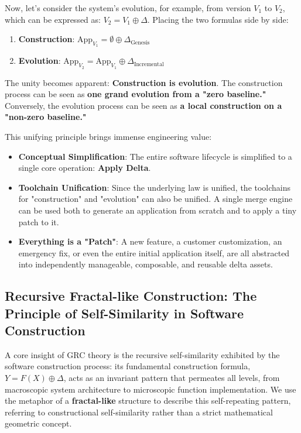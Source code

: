 \documentclass[11pt]{article}
\begin{document}
Now, let's consider the system's evolution, for example, from version $V_1$ to $V_2$, which can be expressed as: $V_2 = V_1 \oplus \Delta$. Placing the two formulas side by side:

\begin{enumerate}
    \item \textbf{Construction}: $\text{App}_{V_1} = \emptyset \oplus \Delta_{\text{Genesis}}$
    \item \textbf{Evolution}: $\text{App}_{V_2} = \text{App}_{V_1} \oplus \Delta_{\text{Incremental}}$
\end{enumerate}

The unity becomes apparent: \textbf{Construction is evolution}. The construction process can be seen as \textbf{one grand evolution from a "zero baseline."} Conversely, the evolution process can be seen as \textbf{a local construction on a "non-zero baseline."}

This unifying principle brings immense engineering value:
\begin{itemize}
    \item \textbf{Conceptual Simplification}: The entire software lifecycle is simplified to a single core operation: \textbf{Apply Delta}.
    \item \textbf{Toolchain Unification}: Since the underlying law is unified, the toolchains for "construction" and "evolution" can also be unified. A single merge engine can be used both to generate an application from scratch and to apply a tiny patch to it.
    \item \textbf{Everything is a "Patch"}: A new feature, a customer customization, an emergency fix, or even the entire initial application itself, are all abstracted into independently manageable, composable, and reusable delta assets.
\end{itemize}

\subsection{Recursive Fractal-like Construction: The Principle of Self-Similarity in Software Construction}

A core insight of GRC theory is the recursive self-similarity exhibited by the software construction process: its fundamental construction formula, $Y = F(X) \oplus \Delta$, acts as an invariant pattern that permeates all levels, from macroscopic system architecture to microscopic function implementation. We use the metaphor of a \textbf{fractal-like} structure to describe this self-repeating pattern, referring to constructional self-similarity rather than a strict mathematical geometric concept.
\end{document}
